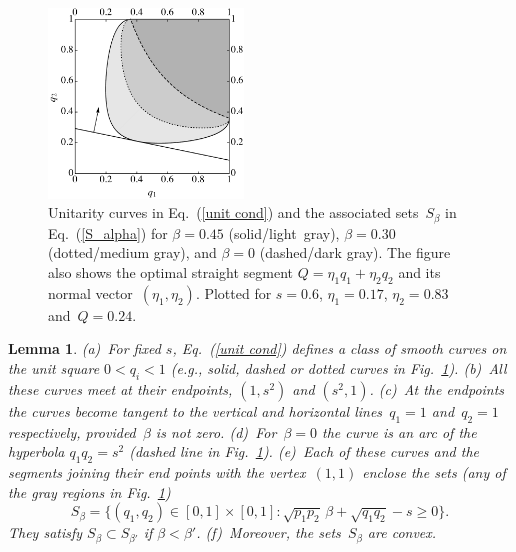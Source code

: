 \documentclass[aps,pra,twocolumn,showpacs]{revtex4-1}
\newtheorem{lemma}{Lemma}
\begin{document}
{\begin{figure}[H]
\vspace{2em}
\centering
\includegraphics[width=14em]{Separation_F0.pdf}
%
\caption{Unitarity curves in Eq.~(\ref{unit cond}) and the associated sets~$S_\beta$ in Eq.~(\ref{S_alpha}) for $\beta=0.45$ (solid/light~gray), $\beta=0.30$ (dotted/medium gray), and $\beta=0$ (dashed/dark gray). The figure also shows the optimal straight segment \mbox{$Q=\eta_1 q_1+\eta_2 q_2$} and its normal vector~$(\eta_1,\eta_2)$. Plotted for  $s = 0.6$, $\eta_1=0.17$, $\eta_2=0.83$ and~$Q=0.24$.}
\label{fig:1}
\end{figure}

\begin{lemma}
(a)~For fixed $s$, Eq.~(\ref{unit cond}) defines a class of smooth curves on the unit square $0< q_i< 1$ (e.g., solid, dashed or dotted curves in Fig.~\ref{fig:1}). (b)~All these curves meet at their endpoints, $(1,s^{2})$ and $(s^{2},1)$. (c)~At the endpoints  the curves become tangent to the vertical and horizontal lines~$q_1=1$ and~$q_2=1$ respectively, provided~$\beta$ is not zero. (d)~For~$\beta=0$ the curve 
is an arc of the hyperbola $q_1 q_2=s^{2}$ (dashed line in Fig.~\ref{fig:1}). 
%
(e)~Each of these curves and the segments joining their end points with the vertex~$(1,1)$ enclose the sets (any of the gray regions in Fig.~\ref{fig:1})
%
\begin{equation}
S_\beta\!=\!\{ (q_1,\!q_2)\!\in\![0,\!1]\!\times\![0,\!1]\!: \sqrt{p_1 p_2}\,\beta+\sqrt{q_1 q_2}-s\!\ge\! 0\}.
\label{S_alpha}
\end{equation}
%
They satisfy $S_{\beta}\subset S_{\beta'}$ if $\beta<\beta'$.
(f)~Moreover, the sets~$S_\beta$ are convex. 
\end{lemma}

}
\end{document}
